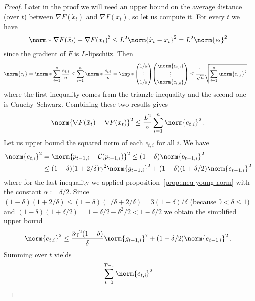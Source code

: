 \documentclass{article}
\begin{document}
\begin{proof}
  Later in the proof we will need an upper bound on the average distance (over $t$) between $\nabla F(\tilde x_t)$ and $\nabla F(x_t)$, so let us compute it. For every $t$ we have
  \begin{align*}
    \norm*{\nabla F(\tilde x_t) - \nabla F(x_t)}^2
    \leq
    L^2 \norm{\tilde x_t - x_t}^2
    =
    L^2 \norm{e_t}^2
  \end{align*}
  since the gradient of $F$ is $L$-lipschitz. Then
  \begin{align*}
    \norm{e_t}
     & =
    \norm*{ \sum_{i=1}^n \frac{e_{t,i}}{n} }
    \leq
    \sum_{i=1}^n \norm*{ \frac{e_{t,i}}{n} }
    =
    \inp*{
      \begin{pmatrix} 1/n \\ \vdots \\ 1/n \end{pmatrix}
    }{
      \begin{pmatrix} \norm{e_{t,1}} \\ \vdots \\ \norm{e_{t,n}} \end{pmatrix}
    }
    \leq
    \frac{1}{\sqrt n} \sqrt{\sum_{i=1}^n \norm{e_{t,i}}^2}
  \end{align*}
  where the first inequality comes from the triangle inequality and the second one is Cauchy--Schwarz. Combining these two results gives
  \[
    \norm{\nabla F(\tilde x_t) - \nabla F(x_t)}^2
    \leq
    \frac{L^2}{n} \sum_{i=1}^n \norm{e_{t,i}}^2
    \, .
  \]
  Let us upper bound the squared norm of each $e_{t,i}$ for all $i$. We have
  \begin{align*}
    \norm{e_{t,i}}^2
     & =
    \norm{p_{t-1,i} - \mathcal C(p_{t-1,i})}^2
    \leq
    (1-\delta) \norm{p_{t-1,i}}^2
    \\
     & \leq
    (1-\delta) (1 + 2/\delta) \gamma^2 \norm{g_{t-1,i}}^2 + (1-\delta)  (1 + \delta/2) \norm{e_{t-1,i}}^2
  \end{align*}
  where for the last inequality we applied proposition~\ref{prop:ineq-young-norm} with the constant $\alpha := \delta/2$. Since $(1-\delta)(1+2/\delta) \leq (1-\delta) (1/\delta+2/\delta) = 3(1-\delta)/\delta$ (because $0 < \delta \leq 1$) and $(1-\delta)(1+\delta/2) = 1 - \delta/2 - \delta^2/2 < 1 - \delta/2$ we obtain the simplified upper bound
  \[
    \norm{e_{t,i}}^2
    \leq
    \frac{3 \gamma^2 (1-\delta)}{\delta} \norm{g_{t-1,i}}^2 + (1-\delta/2) \norm{e_{t-1,i}}^2
    \, .
  \]
  Summing over $t$ yields
  \begin{align*}
    \sum_{t=0}^{T-1} \norm{e_{t,i}}^2

\end{align*}
\end{proof}
\end{document}
